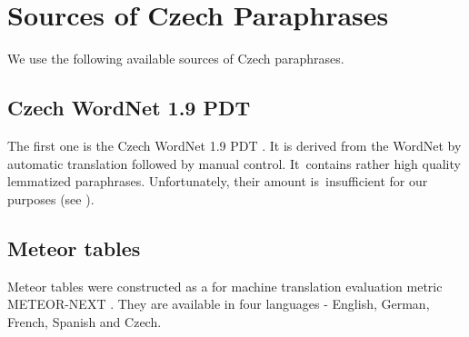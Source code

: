 %
%
%

\section{Sources of Czech Paraphrases}
We use the following available sources of Czech paraphrases.

\subsection{Czech WordNet 1.9 PDT}
The first one is the Czech WordNet 1.9 PDT \citep{czech-wordnet}. It is derived 
from the WordNet \cite{wordnet} by automatic translation followed by manual 
control. It~contains rather high quality lemmatized paraphrases. Unfortunately, 
their amount is~insufficient for our purposes (see ). 


\subsection{Meteor tables} %
\label{meteori}
Meteor tables were constructed as a for machine translation evaluation metric 
METEOR-NEXT \citep{meteor-tables}. They are available in four languages - 
English, German, French, Spanish and Czech. 

